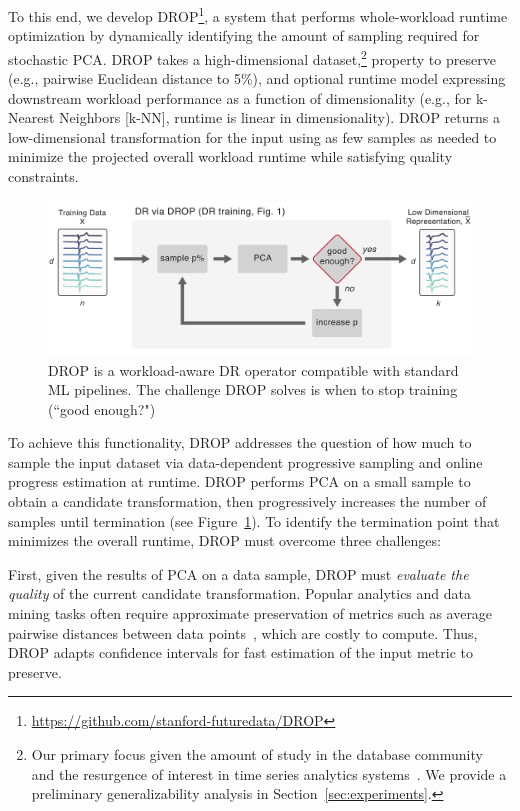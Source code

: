 To this end, we develop DROP\footnote{\href{https://github.com/stanford-futuredata/DROP}{https://github.com/stanford-futuredata/DROP}}, a system that performs whole-workload runtime optimization by dynamically identifying the amount of sampling required for stochastic PCA.
DROP takes a high-dimensional dataset,\footnote{Our primary focus  given the amount of study in the database community~\cite{keogh-study} and the resurgence of interest in time series analytics systems~\cite{macrobase,macrobase-cidr,trill-signal}. We provide a preliminary generalizability analysis in Section~\ref{sec:experiments}.}  property to preserve (e.g., pairwise Euclidean distance to 5\%), and optional runtime model expressing downstream workload performance as a function of dimensionality (e.g., for k-Nearest Neighbors [k-NN], runtime is linear in dimensionality). 
DROP returns a low-dimensional transformation for the input using as few samples as needed to minimize the projected overall workload runtime while satisfying quality constraints.

\begin{figure}
\includegraphics[width=\linewidth]{figs/basic.pdf}
\caption[]{DROP is a workload-aware DR operator compatible with standard ML pipelines. The challenge DROP solves is when to stop training (``good enough?")}
\label{fig:basic}
\end{figure}


To achieve this functionality, DROP addresses the question of how much to sample the input dataset via data-dependent progressive sampling and online progress estimation at runtime.  
DROP performs PCA on a small sample to obtain a candidate transformation, then progressively increases the number of samples until termination (see Figure~\ref{fig:basic}). 
To identify the termination point that minimizes the overall runtime, DROP must overcome three challenges:

First, given the results of PCA on a data sample, DROP must \emph{evaluate the quality} of the current candidate transformation.
Popular analytics and data mining tasks often require approximate preservation of metrics such as average pairwise distances between data points~\cite{time-series-dm,dm-book}, which are costly to compute.
Thus, DROP adapts confidence intervals for fast estimation of the input metric to preserve.


